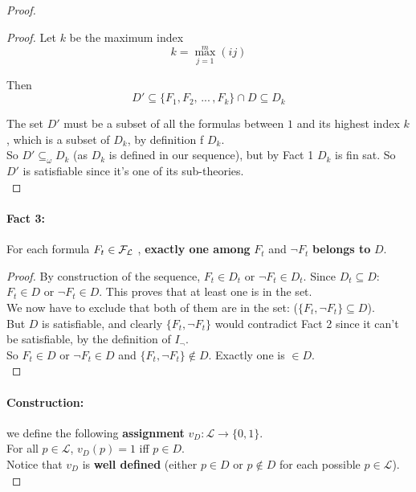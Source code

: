 \documentclass[11pt]{article}
\begin{document}
\begin{proof}
\begin{proof}
			Let $k$ be the maximum index
			$$ k = \max_{j=1}^m (ij) $$
			
			Then 
			$$ D' \subseteq \{F_1, F_2, \, ... \, , F_k\} \cap D \subseteq D_k$$
			
			The set $D'$ must be a subset of all the formulas between $1$ and its highest index $k$, which is a subset of $D_k$, by definition f $D_k$.\\
			
			So $D' \subseteq_\omega D_k$ (as $D_k$ is defined in our sequence), but by Fact 1 $D_k$ is fin sat. So $D'$ is satisfiable since it's one of its sub-theories.\\
		\end{proof}
		
		\newpage
		
		\paragraph{Fact 3:} For each formula $F_t \in \mathcal{F}_\mathcal{L}$ , \textbf{exactly one among} $F_t$ and $\neg F_t$ \textbf{belongs to} $D$.\\
		
		\begin{proof}
			By construction of the sequence, $F_t \in D_t$ or $\neg F_t \in D_t$. Since $D_t \subseteq D$: $F_t \in D$ or $\neg F_t \in D$. This proves that at least one is in the set. \\
			
			We now have to exclude that both of them are in the set: ($\{F_t, \neg F_t\} \subseteq D$).\\
			But $D$ is satisfiable, and clearly $\{F_t, \neg F_t\}$ would contradict Fact 2 since it can't be satisfiable, by the definition of $I_\neg$.\\
			
			So $F_t \in D$ or $\neg F_t \in D$ and $\{F_t, \neg F_t\} \notin D$. Exactly one is $\in D$.\\
		\end{proof}
		
		\paragraph{Construction:} we define the following \textbf{assignment} $v_D: \mathcal{L} \rightarrow \{0,1\}$.\\
		For all $p \in \mathcal{L}$, $v_D (p) = 1$ iff $p \in D$.\\
		
		Notice that $v_D$ is \textbf{well defined} (either $p \in D$ or $p \notin D$ for each possible $p \in \mathcal{L}$).\\
		

\end{proof}
\end{document}
